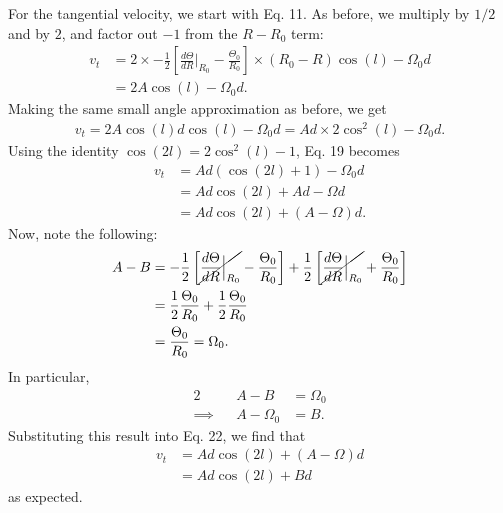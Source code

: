 \documentclass[11pt,letterpaper]{article}
\begin{document}
\begin{enumerate}[label=(\alph*)]
        For the tangential velocity, we start with Eq. 11. As before, we multiply by $1/2$ and by $2$, and factor out $-1$ from the $R-R_0$ term:
        \begin{align}
            v_t &= 2\times -\frac{1}{2}\left[\frac{d\Theta}{dR}\Big|_{R_0} - \frac{\Theta_0}{R_0}\right]\times(R_0-R)\cos(l) - \Omega_0 d \\
            &= 2A\cos(l) - \Omega_0 d.
        \end{align}
        Making the same small angle approximation as before, we get 
        \begin{align}
            v_t = 2A\cos(l)d\cos(l) - \Omega_0 d = Ad\times 2\cos^2(l) - \Omega_0 d.
        \end{align}
        Using the identity $\cos(2l) = 2\cos^2(l) - 1$, Eq. 19 becomes
        \begin{align}
            v_t &= Ad(\cos(2l) + 1) - \Omega_0 d \\
            &= Ad\cos(2l) + Ad - \Omega d \\
            &= Ad\cos(2l) + (A - \Omega)d.
        \end{align}
        Now, note the following:
        \begin{align}
            A - B &= -\frac{1}{2}\left[\cancel{\frac{d\Theta}{dR}\Big|_{R_0}} - \frac{\Theta_0}{R_0}\right] + \frac{1}{2}\left[\cancel{\frac{d\Theta}{dR}\Big|_{R_0}} + \frac{\Theta_0}{R_0}\right] \\
            &= \frac{1}{2}\frac{\Theta_0}{R_0} + \frac{1}{2}\frac{\Theta_0}{R_0} \\ 
            &= \frac{\Theta_0}{R_0} = \Omega_0.
        \end{align}
        In particular, 
        \begin{alignat}{2}
            &&A - B &= \Omega_0 \\
            \implies&&A - \Omega_0 &= B.
        \end{alignat}
        Substituting this result into Eq. 22, we find that 
        \begin{align}
            v_t &= Ad\cos(2l) + (A - \Omega)d \\
            &= Ad\cos(2l) + Bd
        \end{align}
        as expected.

\end{enumerate}
\end{document}
